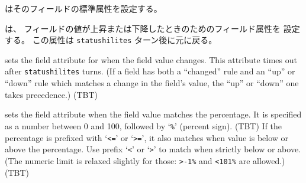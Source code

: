 \blist{}
\item[{\tt always}] はそのフィールドの標準属性を設定する。
\item[{\tt up}, {\tt down}] は、
フィールドの値が上昇または下降したときのためのフィールド属性を
設定する。
この属性は {\tt statushilites} ターン後に元に戻る。
\item[{\tt changed}] sets the field attribute for when the field value
changes. This attribute times out after {\tt statushilites} turns.
(If a field has both a ``changed'' rule and an ``up'' or ``down''
rule which matches a change in the field's value,
the ``up'' or ``down'' one takes precedence.)
(TBT)
\item[{\tt percentage}] sets the field attribute when the field value
matches the percentage.
It is specified as a number between 0 and 100, followed by `{\tt \%}'
(percent sign).
(TBT)
If the percentage is prefixed with `{\tt <=}' or `{\tt >=}',
it also matches when value is below or above the percentage.
Use prefix `{\tt <}' or `{\tt >}' to match when strictly below or above.
(The numeric limit is relaxed slightly for those: {\tt >-1\%}
and {\tt <101\%} are allowed.)
(TBT)
